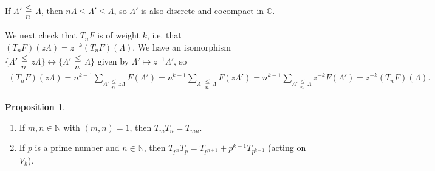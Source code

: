 \documentclass{article}
\theoremstyle{definition}
\newtheorem{prop}[theorem]{Proposition}
\begin{document}
If $\Lambda' \substack{\le  \\ n} \Lambda$, then $n \Lambda \le  \Lambda' \le \Lambda$, so $\Lambda'$ is also discrete and cocompact in $\mathbb{C}$.
\vspace{1mm}
 
We next check that $T_nF$ is of weight $k$, i.e. that $(T_nF)(z \Lambda) = z^{-k}(T_nF)(\Lambda)$. We have an isomorphism $\{\Lambda' \substack{\le \\ n} z\Lambda\} \leftrightarrow \{\Lambda' \substack{\le \\n} \Lambda\}$ given by $\Lambda' \mapsto z^{-1} \Lambda'$, so
\begin{align*}
    (T_nF)(z \Lambda) = n^{k-1}\sum_{\Lambda' \substack{\le \\ n} z\Lambda}^{} F(\Lambda') = n^{k-1} \sum_{\Lambda' \substack{\le  \\ n} \Lambda}^{} F(z \Lambda') = n^{k-1}\sum_{\Lambda' \substack{\le  \\ n} \Lambda} z^{-k}F(\Lambda') = z^{-k}(T_nF)(\Lambda).
\end{align*}
\begin{prop}
    \begin{enumerate}[(1)]
        \item If $m,n \in \mathbb{N}$ with $(m,n) = 1$, then $T_mT_n = T_{mn}$.
        \item If $p$ is a prime number and $n \in \mathbb{N}$, then $T_{p^n}T_p = T_{p^{n+1}}+p^{k-1}T_{p^{k-1}}$ (acting on $V_k$). 
    \end{enumerate}
\end{prop}
\end{document}
